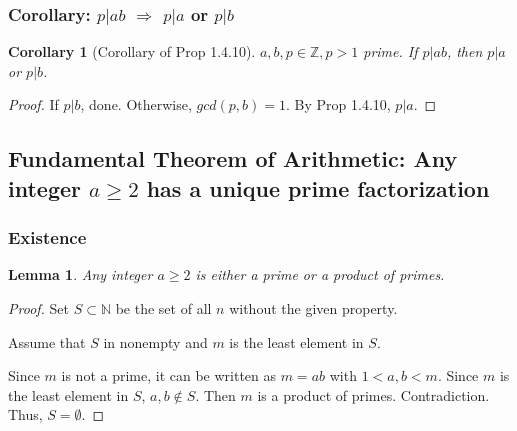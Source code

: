 \documentclass[11pt,a4paper]{article}
\newtheorem{lemma}{Lemma}
\newtheorem{corollary}{Corollary}
\begin{document}
\subsubsection{Corollary: $p|ab$ $\Rightarrow	$ $p|a$ or $p|b$}
\begin{corollary}[Corollary of Prop 1.4.10]
    $a,b,p\in\mathbb{Z}, p>1$ prime. If $p|ab$, then $p|a$ or $p|b$.
\end{corollary}
\begin{proof}
If $p|b$, done. Otherwise, $gcd(p,b)=1$. By Prop 1.4.10, $p|a$.
\end{proof}


\subsection{Fundamental Theorem of Arithmetic: Any integer
$a \geq 2$ has a unique prime factorization}

\subsubsection{Existence}
\begin{lemma}
    Any integer $a \geq 2$ is either a prime or a product of primes.
\end{lemma}
\begin{proof}
    Set $S\subset \mathbb{N}$ be the set of all $n$ without the given property.
    
    Assume that $S$ in nonempty and $m$ is the least element in $S$.

    Since $m$ is not a prime, it can be written as $m=ab$ with $1<a,b<m$. Since $m$ is the least element in $S$, $a,b\notin S$. Then $m$ is a product of primes. Contradiction. Thus, $S=\emptyset$.
\end{proof}
\end{document}
